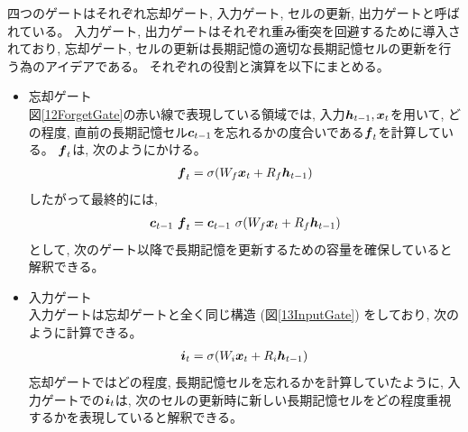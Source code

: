 四つのゲートはそれぞれ忘却ゲート, 入力ゲート, セルの更新, 出力ゲートと呼ばれている。
入力ゲート, 出力ゲートはそれぞれ重み衝突を回避するために導入されており, 忘却ゲート, セルの更新は長期記憶の適切な長期記憶セルの更新を行う為のアイデアである。
それぞれの役割と演算を以下にまとめる。

\begin{itemize}
  \item 忘却ゲート\\
  図\ref{12ForgetGate}の赤い線で表現している領域では, 入力${\mbox{\boldmath{$h$}}}_{t-1},{\mbox{\boldmath{$x$}}}_t$を用いて, どの程度, 直前の長期記憶セル${\mbox{\boldmath{$c$}}}_{t-1}$を忘れるかの度合いである${\mbox{\boldmath{$f$}}}_{t}$を計算している。
  ${\mbox{\boldmath{$f$}}}_{t}$は, 次のようにかける。
\begin{equation}
 \begin{split}
  {\mbox{\boldmath{$f$}}}_{t} = \sigma (W_f {\mbox{\boldmath{$x$}}}_t + R_f {\mbox{\boldmath{$h$}}}_{t-1})
 \end{split}
\end{equation}  
  したがって最終的には, 
\begin{equation}
 \begin{split}
  {\mbox{\boldmath{$c$}}}_{t-1} \  {\mbox{\boldmath{$f$}}}_{t} 
  = {\mbox{\boldmath{$c$}}}_{t-1} \  \sigma (W_f {\mbox{\boldmath{$x$}}}_t + R_f {\mbox{\boldmath{$h$}}}_{t-1})
 \end{split}
\end{equation}
  として, 次のゲート以降で長期記憶を更新するための容量を確保していると解釈できる。

  \item 入力ゲート\\
  入力ゲートは忘却ゲートと全く同じ構造 (図\ref{13InputGate}) をしており, 次のように計算できる。
\begin{equation}
 \begin{split}
  {\mbox{\boldmath{$i$}}}_{t} = \sigma (W_i {\mbox{\boldmath{$x$}}}_t + R_i {\mbox{\boldmath{$h$}}}_{t-1})
 \end{split}
\end{equation}
  忘却ゲートではどの程度, 長期記憶セルを忘れるかを計算していたように, 入力ゲートでの${\mbox{\boldmath{$i$}}}_{t}$は, 次のセルの更新時に新しい長期記憶セルをどの程度重視するかを表現していると解釈できる。
    

\end{itemize}
